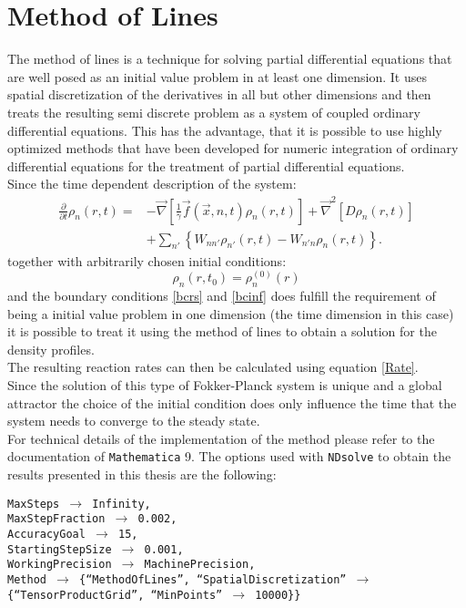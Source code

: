 \section{Method of Lines}
\label{method_of_lines}
The method of lines \cite{pregla1989, saucez2001} is a technique for solving partial differential equations that are well posed as an initial value problem in at least one dimension. It uses spatial discretization of the derivatives in all but other dimensions and then treats the resulting semi discrete problem as a system of coupled ordinary differential equations. This has the advantage, that it is possible to use highly optimized methods that have been developed for numeric integration of ordinary differential equations for the treatment of partial differential equations.\\
Since the time dependent description of the system: 
\begin{align}
    \frac{\partial}{\partial t } \rho_n(r,t) =   &- \vec{ \nabla } \left[\frac{1}{\gamma}\vec{f}(\vec{x},n,t)\rho_n(r,t) \right] +\vec{\nabla}^{2}\left[ D\rho_n(r,t) \right] \nonumber \\
    &+ \sum_{n'} \left\{ W_{nn'}\rho_{n'}(r,t) - W_{n'n}\rho_n(r,t)\right\}.
    \label{fpmeqmol}
\end{align}
together with arbitrarily chosen initial conditions:
\begin{equation}
    \rho_n(r,t_0) = \rho_n^{(0)}(r)
    \label{rho0mol}
\end{equation}
and the boundary conditions \eqref{bcrs} and \eqref{bcinf} does fulfill the requirement of being a initial value problem in one dimension (the time dimension in this case) it is possible to treat it using the method of lines to obtain a solution for the density profiles.\\
The resulting reaction rates can then be calculated using equation \eqref{Rate}.\\
Since the solution of this type of Fokker-Planck system is unique \cite{soize1994} and a global attractor \cite{Efendiev2000} the choice of the initial condition does only influence the time that the system needs to converge to the steady state.\\
For technical details of the implementation of the method please refer to the documentation of {\tt Mathematica} 9\textsuperscript{\textregistered}. The options used with {\tt NDsolve} to obtain the results presented in this thesis are the following:\par
{\tt    MaxSteps $\rightarrow$ Infinity,  \\
        MaxStepFraction $\rightarrow$ 0.002, \\
        AccuracyGoal $\rightarrow$ 15,  \\
        StartingStepSize $\rightarrow$ 0.001, \\
        WorkingPrecision $\rightarrow$ MachinePrecision, \\
        Method $\rightarrow$ \{``MethodOfLines'', ``SpatialDiscretization'' $\rightarrow$ \{``TensorProductGrid'', ``MinPoints'' $\rightarrow$ 10000\}\}}



